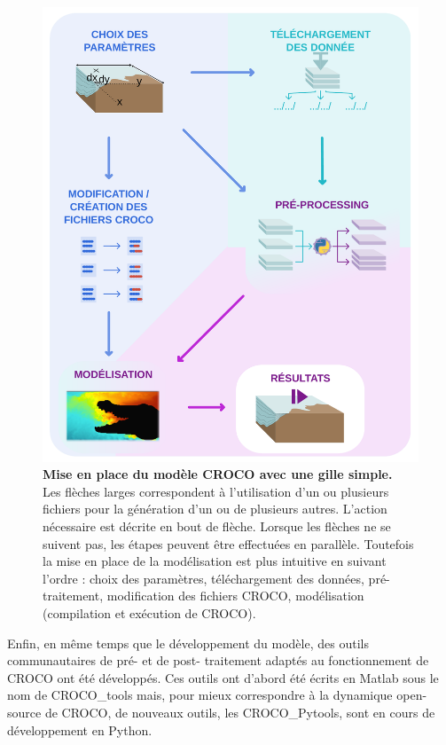 \documentclass[10pt,a4paper,titlepage]{article}
\begin{document}
\begin{figure}[h!]
    \centering
    \includegraphics[scale=0.35]{../images/workflow/mise_en_place_generale_croco.pdf}
    \caption{
        \textbf{Mise en place du modèle CROCO avec une gille simple.}
        \\Les flèches larges correspondent à l'utilisation d'un ou plusieurs fichiers pour la génération d'un ou de plusieurs autres.
        L'action nécessaire est décrite en bout de flèche.
        Lorsque les flèches ne se suivent pas, les étapes peuvent être effectuées en parallèle.
        Toutefois la mise en place de la modélisation est plus intuitive en suivant l'ordre : {\color{paramColor}choix des paramètres}, {\color{dataColor} téléchargement des données}, {\color{workColor} pré-traitement}, {\color{paramColor} modification des fichiers CROCO}, {\color{workColor} modélisation (compilation et exécution de CROCO)}.
        }
    \label{workflow_simple}
\end{figure}

Enfin, en même temps que le développement du modèle, des outils communautaires de pré- et de post- traitement adaptés au fonctionnement de CROCO ont été développés.
Ces outils ont d'abord été écrits en Matlab sous le nom de CROCO\_tools mais, pour mieux correspondre à la dynamique open-source de CROCO, de nouveaux outils, les CROCO\_Pytools, sont en cours de développement en Python.
\end{document}

